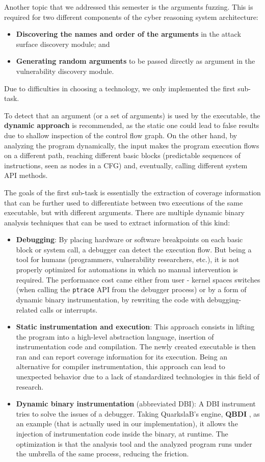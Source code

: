 \documentclass[12pt,a4paper,english,onecolumn]{IEEEtran}
\begin{document}
Another topic that we addressed this semester is the arguments fuzzing. This is required for two different components of the cyber reasoning system architecture:
\begin{itemize}
    \item \textbf{Discovering the names and order of the arguments} in the attack surface discovery module; and
    \item \textbf{Generating random arguments} to be passed directly as argument in the vulnerability discovery module.
\end{itemize}

Due to difficulties in choosing a technology, we only implemented the first sub-task.

To detect that an argument (or a set of arguments) is used by the executable, the \textbf{dynamic approach} is recommended, as the static one could lead to false results due to shallow inspection of the control flow graph. On the other hand, by analyzing the program dynamically, the input makes the program execution flows on a different path, reaching different basic blocks (predictable sequences of instructions, seen as nodes in a CFG) and, eventually, calling different system API methods.

The goals of the first sub-task is essentially the extraction of coverage information that can be further used to differentiate between two executions of the same executable, but with different arguments. There are multiple dynamic binary analysis techniques that can be used to extract information of this kind: 
\begin{itemize}
    \item \textbf{Debugging}: By placing hardware or software breakpoints on each basic block or system call, a debugger can detect the execution flow. But being a tool for humans (programmers, vulnerability researchers, etc.), it is not properly optimized for automations in which no manual intervention is required. The performance cost came either from user - kernel spaces switches (when calling the \texttt{ptrace} API from the debugger process) or by a form of dynamic binary instrumentation, by rewriting the code with debugging-related calls or interrupts.
    \item \textbf{Static instrumentation and execution}: This approach consists in lifting the program into a high-level abstraction language, insertion of instrumentation code and compilation. The newly created executable is then ran and can report coverage information for its execution. Being an alternative for compiler instrumentation, this approach can lead to unexpected behavior due to a lack of standardized technologies in this field of research.
    \item \textbf{Dynamic binary instrumentation} (abbreviated DBI): A DBI instrument tries to solve the issues of a debugger. Taking QuarkslaB's engine, \textbf{QBDI} \cite{qbdi}, as an example (that is actually used in our implementation), it allows the injection of instrumentation code inside the binary, at runtime. The optimization is that the analysis tool and the analyzed program runs under the umbrella of the same process, reducing the friction.
\end{itemize}
\end{document}
